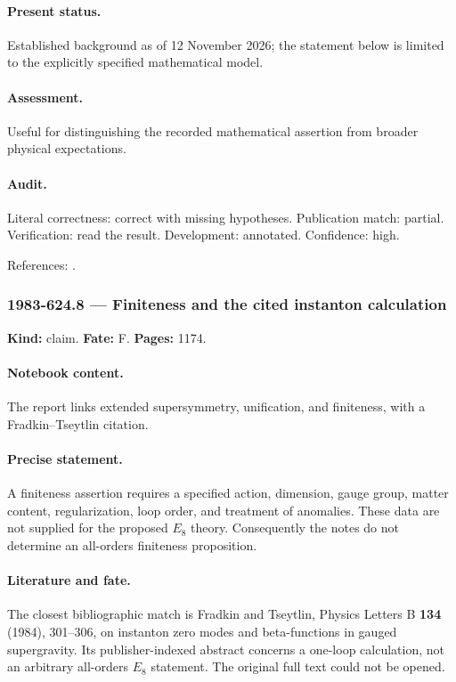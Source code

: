 \paragraph{Present status.} Established background as of 12 November 2026; the statement below is limited to the explicitly specified mathematical model.

\paragraph{Assessment.} Useful for distinguishing the recorded mathematical assertion from broader physical expectations.

\paragraph{Audit.} Literal correctness: correct with missing hypotheses. Publication match: partial. Verification: read the result. Development: annotated. Confidence: high.

\noindent References: \citep{stepanyantz2024flipped}.\par

\subsubsection{1983-624.8 --- Finiteness and the cited instanton calculation}

\label{item:1983-624.8}

\noindent\textbf{Kind:} claim. \textbf{Fate:} F. \textbf{Pages:} 1174.\par

\paragraph{Notebook content.} The report links extended supersymmetry, unification, and finiteness, with a Fradkin–Tseytlin citation.

\paragraph{Precise statement.} A finiteness assertion requires a specified action, dimension, gauge group, matter content, regularization, loop order, and treatment of anomalies. These data are not supplied for the proposed \(E_8\) theory. Consequently the notes do not determine an all-orders finiteness proposition.

\paragraph{Literature and fate.} The closest bibliographic match is Fradkin and Tseytlin, Physics Letters B \textbf{134} (1984), 301–306, on instanton zero modes and beta-functions in gauged supergravity. Its publisher-indexed abstract concerns a one-loop calculation, not an arbitrary all-orders \(E_8\) statement. The original full text could not be opened.

